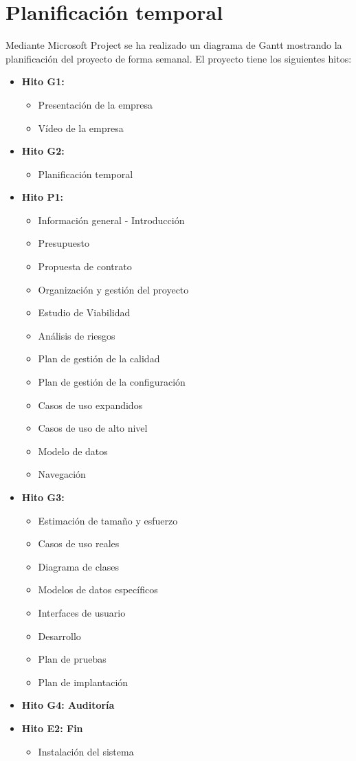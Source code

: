 \chapter{Planificación temporal}
\par Mediante Microsoft Project se ha realizado un diagrama de Gantt mostrando la planificación del proyecto de forma semanal. El proyecto tiene los siguientes hitos:
\begin{itemize}
	\item \textbf{Hito G1:}
	\begin{itemize}
		\item Presentación de la empresa
		\item Vídeo de la empresa
	\end{itemize}
	\item \textbf{Hito G2:}
	\begin{itemize}
		\item Planificación temporal
	\end{itemize}
	\item \textbf{Hito P1:}
	\begin{itemize}
		\item Información general - Introducción
		\item Presupuesto
		\item Propuesta de contrato
		\item Organización y gestión del proyecto
		\item Estudio de Viabilidad
		\item Análisis de riesgos
		\item Plan de gestión de la calidad
		\item Plan de gestión de la configuración
		\item Casos de uso expandidos
		\item Casos de uso de alto nivel
		\item Modelo de datos
		\item Navegación
	\end{itemize}
	\item \textbf{Hito G3:}
	\begin{itemize}
		\item Estimación de tamaño y esfuerzo
		\item Casos de uso reales
		\item Diagrama de clases
		\item Modelos de datos específicos
		\item Interfaces de usuario
		\item Desarrollo
		\item Plan de pruebas
		\item Plan de implantación
	\end{itemize}
	\item \textbf{Hito G4: Auditoría}
	\item \textbf{Hito E2: Fin}
	\begin{itemize}
		\item Instalación del sistema
	\end{itemize}
\end{itemize}

